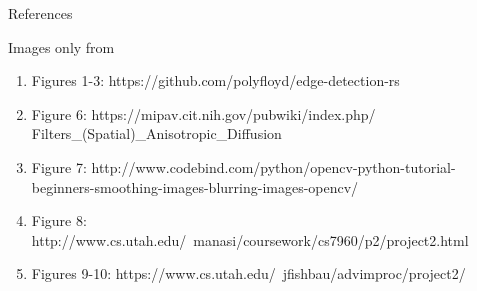 \documentclass{beamer}
\begin{document}
\begin{frame}{References}
    \begin{block}{Images only from}
    \begin{enumerate}
        \item Figures 1-3: https://github.com/polyfloyd/edge-detection-rs
        \item Figure 6: https://mipav.cit.nih.gov/pubwiki/index.php/ Filters\_(Spatial)\_Anisotropic\_Diffusion
        \item Figure 7: http://www.codebind.com/python/opencv-python-tutorial-beginners-smoothing-images-blurring-images-opencv/
        \item Figure 8: http://www.cs.utah.edu/~manasi/coursework/cs7960/p2/project2.html
        \item Figures 9-10: https://www.cs.utah.edu/~jfishbau/advimproc/project2/
    \end{enumerate}
    \end{block}

\end{frame}
\end{document}
